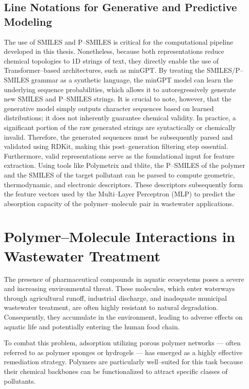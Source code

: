 \subsection*{Line Notations for Generative and Predictive Modeling}
The use of SMILES and P--SMILES is critical for the computational pipeline developed in this thesis. Nonetheless, because both representations reduce chemical topologies to 1D strings of text, they directly enable the use of Transformer--based architectures, such as minGPT. By treating the SMILES/P--SMILES grammar as a synthetic language, the minGPT model can learn the underlying sequence probabilities, which allows it to autoregressively generate new SMILES and P--SMILES strings. It is crucial to note, however, that the generative model simply outputs character sequences based on learned distributions; it does not inherently guarantee chemical validity. In practice, a significant portion of the raw generated strings are syntactically or chemically invalid. Therefore, the generated sequences must be subsequently parsed and validated using RDKit, making this post--generation filtering step essential.
Furthermore, valid representations serve as the foundational input for feature extraction. Using tools like Polymetrix and tblite, the P--SMILES of the polymer and the SMILES of the target pollutant can be parsed to compute geometric, thermodynamic, and electronic descriptors. These descriptors subsequently form the feature vectors used by the Multi--Layer Perceptron (MLP) to predict the absorption capacity of the polymer--molecule pair in wastewater applications.


\section{Polymer--Molecule Interactions in Wastewater Treatment}
\label{sec:interactions}

The presence of pharmaceutical compounds in aquatic ecosystems poses a severe and increasing environmental threat. These molecules, which enter waterways through agricultural runoff, industrial discharge, and inadequate municipal wastewater treatment, are often highly resistant to natural degradation. Consequently, they accumulate in the environment, leading to adverse effects on aquatic life and potentially entering the human food chain.

To combat this problem, adsorption utilizing porous polymer networks — often referred to as polymer sponges or hydrogels — has emerged as a highly effective remediation strategy. Polymers are particularly well--suited for this task because their chemical backbones can be functionalized to attract specific classes of pollutants. 

